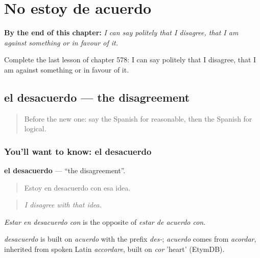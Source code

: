
\chapter{No estoy de acuerdo}
\label{ch:es-no-estoy-de-acuerdo}

\begin{chapteropening}
\textbf{By the end of this chapter:} \emph{I can say politely that I disagree, that I am against something or in favour of it.}

Complete the last lesson of chapter 578: I can say politely that I disagree, that I am against something or in favour of it.
\end{chapteropening}

\section[el desacuerdo]{el desacuerdo — the disagreement}

\label{lesson:ES-C578-desacuerdo}



\begin{quote}
Before the new one: say the Spanish for reasonable, then the Spanish for logical.
\end{quote}

\subsection*{You'll want to know: el desacuerdo}
\textbf{el desacuerdo} — \textquotedblleft{}the disagreement\textquotedblright{}.

\begin{quote}
Estoy en desacuerdo con esa idea.
\end{quote}

\begin{quote}
\emph{I disagree with that idea.}
\end{quote}

\emph{Estar en desacuerdo con} is the opposite of \emph{estar de acuerdo con}.

\begin{cousinweb}
\emph{desacuerdo} is built on \emph{acuerdo} with the prefix \emph{des-}; \emph{acuerdo} comes from \emph{acordar}, inherited from spoken Latin \emph{accordare}, built on \emph{cor} 'heart' (EtymDB).
\end{cousinweb}

